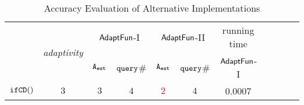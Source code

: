 {\scriptsize
\begin {table}[t]
\vspace{-0.1cm}
    \caption{Accuracy Evaluation of {\THESYSTEM}  Alternative Implementations}
    \vspace{-0.3cm}
        \label{tb:adapt-imp-alternatives}
        \begin{center}
        \centering
{\scriptsize
        \begin{tabular}{ | >{\tiny}l | c | c | c | c | c | c | c | c | c  |c}
        \hline \hline
        \multirow{2}{*}{Program $c$}
        &\multirow{2}{*}{\emph{adaptivity}}
         & \multicolumn{2}{c|}{$\textsf{AdaptFun}$-I}
         & \multicolumn{2}{c|}{$\textsf{AdaptFun}$-II}
         & {running time} \\ 
         \cline{3-9}
        & & {${\mathtt{A_{est}}}$ } & {${\tt query}$\# } & {${\mathtt{A_{est}}}$ } & {${\tt query}$\# }  & $\textsf{AdaptFun}$-I \\
         \cline{8-9}
         \hline \hline
          $  \mathtt{ifCD()}$  &  $3$  & $3$ &   $4$  & \textcolor{red}{$2$} & $4$ & 0.0007 \\

\end{tabular}}
\end{center}
\end{table}}
